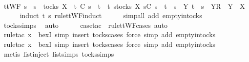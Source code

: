 \begin{isabellebody}
\ \ \isamarkupfalse%
\ \isamarkupfalse%
\ {\isachardoublequoteopen}ttWF\ s\ {\isasymlongrightarrow}\ s\ {\isasymin}\ tocks\ X\ {\isasymlongrightarrow}\ t\ {\isasymlesssim}\isactrlsub C\ s\ {\isasymlongrightarrow}\ t\ {\isasymin}\ {\isacharbraceleft}t{\isachardot}\ {\isasymexists}s{\isacharprime}{\isasymin}tocks\ X{\isachardot}\ s{\isacharprime}{\isasymlesssim}\isactrlsub C\ s\ {\isasymand}\ {\isacharparenleft}t\ {\isacharequal}\ s{\isacharprime}\ {\isasymor}\ {\isacharparenleft}{\isasymexists}Y{\isachardot}\ t\ {\isacharequal}\ s{\isacharprime}\ {\isacharat}\ {\isacharbrackleft}{\isacharbrackleft}Y{\isacharbrackright}\isactrlsub R{\isacharbrackright}\ {\isasymand}\ Y\ {\isasymsubseteq}\ X{\isacharparenright}{\isacharparenright}{\isacharbraceright}{\isachardoublequoteclose}\isanewline
\ \ \ \ \isamarkupfalse%
\ {\isacharparenleft}induct\ t\ s\ rule{\isacharcolon}ttWF{}{\isachardot}induct{\isacharparenright}\isanewline
\ \ \ \ \isamarkupfalse%
\ {\isacharparenleft}simp{\isacharunderscore}all\ add{\isacharcolon}\ empty{\isacharunderscore}in{\isacharunderscore}tocks{\isacharparenright}\isanewline
\ \ \ \ \isamarkupfalse%
\ tocks{\isachardot}simps\ \isamarkupfalse%
\ auto{\isacharbrackleft}{}{\isacharbrackright}\isanewline
\ \ \ \ \isamarkupfalse%
\ {\isacharparenleft}case{\isacharunderscore}tac\ {\isasymsigma}\ rule{\isacharcolon}ttWF{\isachardot}cases{\isacharcomma}\ auto{\isacharparenright}\isanewline
\ \ \ \ \isamarkupfalse%
\ {\isacharparenleft}rule{\isacharunderscore}tac\ x{\isacharequal}{\isachardoublequoteopen}{\isacharbrackleft}{\isacharbrackright}{\isachardoublequoteclose}\ \ bexI{\isacharcomma}\ simp{\isacharcomma}\ insert\ tocks{\isachardot}cases{\isacharcomma}\ force{\isacharcomma}\ simp\ add{\isacharcolon}\ empty{\isacharunderscore}in{\isacharunderscore}tocks{\isacharparenright}\isanewline
\ \ \ \ \isamarkupfalse%
\ {\isacharparenleft}rule{\isacharunderscore}tac\ x{\isacharequal}{\isachardoublequoteopen}{\isacharbrackleft}{\isacharbrackright}{\isachardoublequoteclose}\ \ bexI{\isacharcomma}\ simp{\isacharcomma}\ insert\ tocks{\isachardot}cases{\isacharcomma}\ force{\isacharcomma}\ simp\ add{\isacharcolon}\ empty{\isacharunderscore}in{\isacharunderscore}tocks{\isacharparenright}\isanewline
\ \ \ \ \isamarkupfalse%
\ {\isacharparenleft}metis\ list{\isachardot}inject\ list{\isachardot}simps{\isacharparenleft}{}{\isacharparenright}\ tocks{\isachardot}simps{\isacharparenright}\isanewline

\end{isabellebody}
